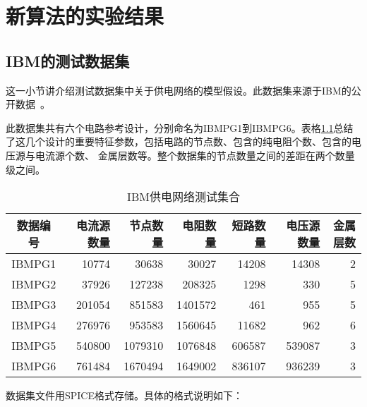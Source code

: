 \chapter{新算法的实验结果}
\label{cha:exp}

\section{IBM的测试数据集}

这一小节讲介绍测试数据集中关于供电网络的模型假设。此数据集来源于IBM的公开数据~\cite{nassif2008power}。

此数据集共有六个电路参考设计，分别命名为IBMPG1到IBMPG6。表格\ref{tab:tabibm}总结了这几个设计的重要特征参数，包括电路的节点数、包含的纯电阻个数、包含的电压源与电流源个数、
金属层数等。整个数据集的节点数量之间的差距在两个数量级之间。

\begin{table}[htbp]
\centering
\caption{IBM供电网络测试集合}
\label{tab:tabibm}
\begin{tabular}{|c|r|r|r|r|r|r|}
\toprule[1.5pt]
\hline
数据编号 & 电流源数量 & 节点数量 & 电阻数量 & 短路数量 & 电压源数量 & 金属层数 \\
\hline
IBMPG1 & 10774 & 30638  & 30027  & 14208  &  14308 & 2\\
\hline
IBMPG2 & 37926 & 127238 & 208325 & 1298  & 330 & 5\\
\hline
IBMPG3 & 201054 & 851583 & 1401572 & 461 & 955 &  5\\
\hline
IBMPG4 & 276976 & 953583 & 1560645 & 11682 & 962  & 6\\
\hline
IBMPG5 & 540800 & 1079310 & 1076848 & 606587 & 539087 &  3\\
\hline
IBMPG6 & 761484 & 1670494 & 1649002 & 836107 & 936239 &  3\\
\hline
\end{tabular}
\end{table}

数据集文件用SPICE格式存储。具体的格式说明如下：


